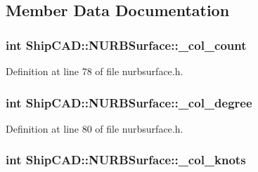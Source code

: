 \subsection{Member Data Documentation}
\hypertarget{classShipCAD_1_1NURBSurface_aac0a2d528cec007b0fb6a154f3a67672}{
\subsubsection[{\-\_\-col\-\_\-count}]{\setlength{\rightskip}{0pt plus 5cm}int Ship\-C\-A\-D\-::\-N\-U\-R\-B\-Surface\-::\-\_\-col\-\_\-count\hspace{0.3cm}{\ttfamily [protected]}}}\label{classShipCAD_1_1NURBSurface_aac0a2d528cec007b0fb6a154f3a67672}


Definition at line 78 of file nurbsurface.\-h.

\hypertarget{classShipCAD_1_1NURBSurface_a0192ed41981e4a3525f52be71ceb0e7c}{
\subsubsection[{\-\_\-col\-\_\-degree}]{\setlength{\rightskip}{0pt plus 5cm}int Ship\-C\-A\-D\-::\-N\-U\-R\-B\-Surface\-::\-\_\-col\-\_\-degree\hspace{0.3cm}{\ttfamily [protected]}}}\label{classShipCAD_1_1NURBSurface_a0192ed41981e4a3525f52be71ceb0e7c}


Definition at line 80 of file nurbsurface.\-h.

\hypertarget{classShipCAD_1_1NURBSurface_a2b0e2649a54a57a9ae6fbeed031b04d0}{
\subsubsection[{\-\_\-col\-\_\-knots}]{\setlength{\rightskip}{0pt plus 5cm}int Ship\-C\-A\-D\-::\-N\-U\-R\-B\-Surface\-::\-\_\-col\-\_\-knots\hspace{0.3cm}{\ttfamily [protected]}}}\label{classShipCAD_1_1NURBSurface_a2b0e2649a54a57a9ae6fbeed031b04d0}


